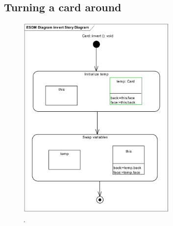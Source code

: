\subsection{Turning a card around}
\begin{figure}[htp]
\begin{center}
  \includegraphics[width=0.7\textwidth]{pics/sdmBilder/invert/sdm54}
  \caption{.}  
  \label{fig:sdm_invert_}
\end{center}
\end{figure}

\clearpage 